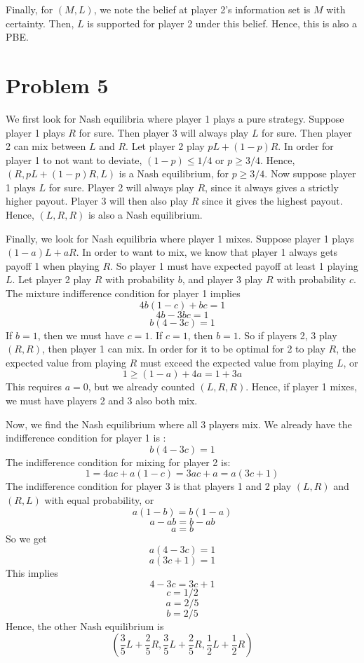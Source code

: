 \documentclass[10pt,letter]{article}
\begin{document}
Finally, for $(M,L)$, we note the belief at player 2's information set is $M$ with certainty. Then, $L$ is supported for player 2 under this belief. Hence, this is also a PBE.

\section*{Problem 5}
We first look for Nash equilibria where player 1 plays a pure strategy. Suppose player 1 plays $R$ for sure. Then player 3 will always play $L$ for sure. Then player 2 can mix between $L$ and $R$. Let player 2 play $pL + (1-p)R$. In order for player 1 to not want to deviate, $(1-p) \le 1/4$ or $p \ge 3/4$. Hence, $(R, pL + (1-p)R, L)$ is a Nash equilibrium, for $p \ge 3/4$. Now suppose player 1 plays $L$ for sure. Player 2 will always play $R$, since it always gives a strictly higher payout. Player 3 will then also play $R$ since it gives the highest payout. Hence, $(L,R,R)$ is also a Nash equilibrium.

Finally, we look for Nash equilibria where player 1 mixes. Suppose player 1 plays $(1-a)L + aR$. In order to want to mix, we know that player 1 always gets payoff 1 when playing $R$. So player 1 must have expected payoff at least 1 playing $L$. Let player 2 play $R$ with probability $b$, and player 3 play $R$ with probability $c$. The mixture indifference condition for player 1 implies
\[ 4b(1-c) + bc = 1 \]
\[ 4b - 3bc = 1 \]
\[ b(4 - 3c) = 1 \]
If $b=1$, then we must have $c=1$. If $c=1$, then $b=1$. So if players 2, 3 play $(R,R)$, then player 1 can mix. In order for it to be optimal for 2 to play $R$, the expected value from playing $R$ must exceed the expected value from playing $L$, or
\[ 1 \ge (1-a) + 4a = 1 + 3a \]
This requires $a = 0$, but we already counted $(L,R,R)$. Hence, if player 1 mixes, we must have players 2 and 3 also both mix.

Now, we find the Nash equilibrium where all 3 players mix. We already have the indifference condition for player 1 is :
\[ b(4 - 3c) = 1 \]
The indifference condition for mixing for player 2 is:
\[ 1 = 4ac + a(1-c) = 3ac + a = a(3c + 1) \]
The indifference condition for player 3 is that players 1 and 2 play $(L,R)$ and $(R, L)$ with equal probability, or
\[ a(1-b) = b(1-a) \]
\[ a - ab = b - ab \]
\[ a = b \]
So we get
\[ a(4 - 3c) = 1 \]
\[ a(3c + 1) = 1 \]
This implies
\[ 4 - 3c = 3c + 1 \]
\[ c = 1/2 \]
\[ a = 2/5 \]
\[ b = 2/5 \]
Hence, the other Nash equilibrium is
\[ \left( \frac{3}{5}L + \frac{2}{5}R,\frac{3}{5}L + \frac{2}{5}R,\frac{1}{2}L + \frac{1}{2}R \right) \]
\end{document}
